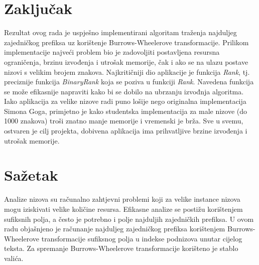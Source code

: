 \documentclass[times, utf8, seminar, numeric]{fer}
\begin{document}
\chapter{Zaključak}
Rezultat ovog rada je uspješno implementirani algoritam traženja najduljeg zajedničkog prefiksa uz korištenje Burrows-Wheelerove transformacije. Prilikom implementacije najveći problem bio je zadovoljiti postavljena resursna ograničenja, brzinu izvođenja i utrošak memorije, čak i ako se na ulazu postave nizovi s velikim brojem znakova. Najkritičniji dio aplikacije je funkcija \textit{Rank}, tj. preciznije funkcija \textit{BinaryRank} koja se poziva u funkciji \textit{Rank}. Navedena funkcija se može efikasnije napraviti kako bi se dobilo na ubrzanju izvođnja algoritma. Iako aplikacija za velike nizove radi puno lošije nego originalna implementacija Simona Goga, primjetno je kako studentska implementacija za male nizove (do 1000 znakova) troši znatno manje memorije i vremenski je brža. Sve u svemu, ostvaren je cilj projekta, dobivena aplikacija ima prihvatljive brzine izvođenja i utrošak memorije. 




\chapter{Sažetak}
Analize nizova su računalno zahtjevni problemi koji za velike instance nizova mogu iziskivati velike količine resursa. Efikasne analize se postižu korištenjem sufiksnih polja, a često je potrebno i polje najduljih zajedničkih prefiksa. U ovom radu objašnjeno je računanje najduljeg zajedničkog prefiksa korištenjem Burrows-Wheelerove transformacije sufiksnog polja u indekse podnizova unutar cijelog teksta. Za spremanje Burrows-Wheelerove transformacije korišteno je stablo valića.
\end{document}
